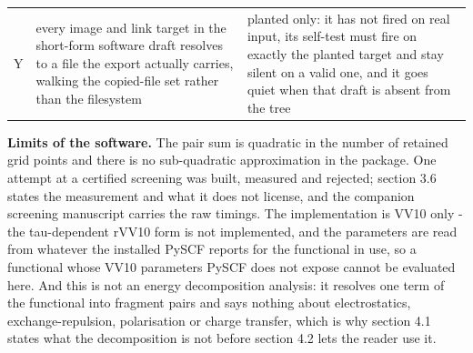 \documentclass[11pt]{article}
\begin{document}
\begin{longtable}{c>{\raggedright\arraybackslash}p{}>{\raggedright\arraybackslash}p{}}
Y & every image and link target in the short-form software draft resolves to a file the export actually carries, walking the copied-file set rather than the filesystem & planted only: it has not fired on real input, its self-test must fire on exactly the planted target and stay silent on a valid one, and it goes quiet when that draft is absent from the tree \\
\end{longtable}
\normalsize

\textbf{Limits of the software.} The pair sum is quadratic in the number of retained grid points and there is no sub-quadratic approximation in the package. One attempt at a certified screening was built, measured and rejected; section 3.6 states the measurement and what it does not license, and the companion screening manuscript carries the raw timings. The implementation is VV10 only - the tau-dependent rVV10 form is not implemented, and the parameters are read from whatever the installed PySCF reports for the functional in use, so a functional whose VV10 parameters PySCF does not expose cannot be evaluated here. And this is not an energy decomposition analysis: it resolves one term of the functional into fragment pairs and says nothing about electrostatics, exchange-repulsion, polarisation or charge transfer, which is why section 4.1 states what the decomposition is not before section 4.2 lets the reader use it.
\end{document}
